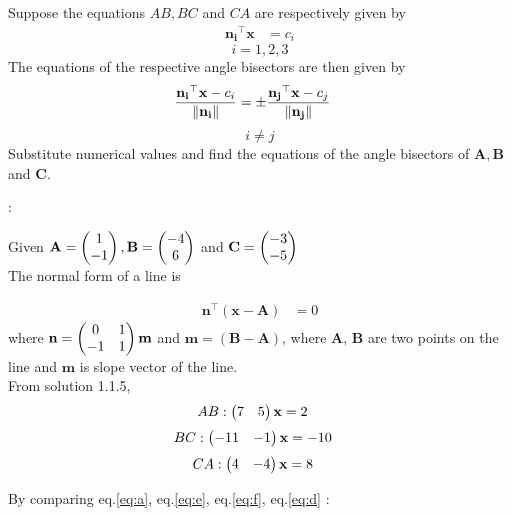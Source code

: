 \documentclass{article}
\begin{document}
\let\vec\mathbf
Suppose the equations $AB, BC$ and $CA$ are respectively given by 
                 \begin{align}
                 \label{eq:a}
                 \vec{n_i}^{\top}\vec{x} &= c_i
                 \end{align}      
                \[i=1,2,3\]
The equations of the respective angle bisectors are then given by
\begin{align}
\label{eq:b}
\frac{\vec{n_i}^{\top}\vec{x}-c_i}{\norm{\vec{n_i}}} &= \pm\frac{\vec{n_j}^{\top}\vec{x}-c_j}{\norm{{\vec{n_j}}}}
\end{align}
\[i \neq j\]
Substitute numerical values and find the equations of the angle bisectors of $\vec{A},\vec{B}$ and $\vec{C}$.

\solution:
   
Given $\vec{A} = \myvec{1\\-1}, \vec{B} = \myvec{-4\\6}$ and $\vec{C} = \myvec{-3\\-5}$
 \\The normal form of a line is 
                                    
           \begin{align}
           \label{eq:c}
           \vec{n}^{\top}(\vec{x}-\vec{A}) &= 0   
           \end{align}
           where $\vec{n} = \myvec{0&1\\-1&1}\vec{m}$ and $\vec{m} = (\vec{B} - \vec{A})$, where $\vec{A}$, $\vec{B}$ are two points on the line and $\vec{m}$ is slope vector of the line.\\
 From solution 1.1.5,
         \begin{align}
         \label{eq:e}
        AB : \myvec{7&5}\vec{x} &= 2
        \end{align}
                 \begin{align}
          \label{eq:f}
         BC : \myvec{-11&-1}\vec{x} &= -10
        \end{align}
        \begin{align}
  \label{eq:d}
        CA : \myvec{4&-4}\vec{x} &= 8
        \end{align}
            
By comparing eq.\ref{eq:a}, eq.\ref{eq:e},  eq.\ref{eq:f},  eq.\ref{eq:d}  :
     
\end{document}
